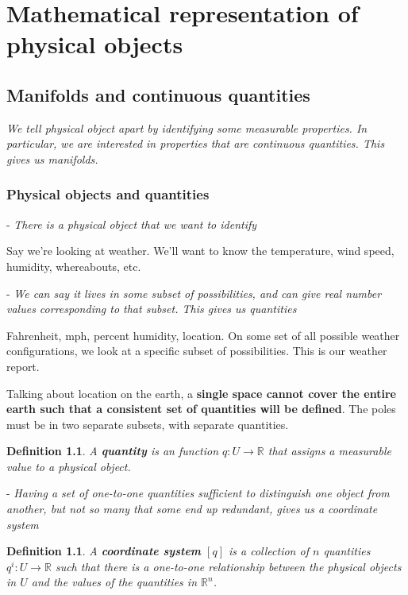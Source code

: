 \documentclass{book}
\newtheorem{defn}[equation]{Definition}
\begin{document}
\tableofcontents

\chapter{Mathematical representation of physical objects}



\section{Manifolds and continuous quantities}
\emph{We tell physical object apart by identifying some measurable properties. In particular, we are interested in properties that are continuous quantities. This gives us manifolds.}

\subsection{Physical objects and quantities}

- \emph{There is a physical object that we want to identify}

Say we're looking at weather. We'll want to know the temperature, wind speed, humidity, whereabouts, etc.

- \emph{We can say it lives in some subset of possibilities, and can give real number values corresponding to that subset. This gives us quantities}

Fahrenheit, mph, percent humidity, location.
On some set of all possible weather configurations, we look at a specific subset of possibilities. This is our weather report.  

Talking about location on the earth, a \textbf{single space cannot cover the entire earth such that a consistent set of quantities will be defined}. The poles must be in two separate subsets, with separate quantities. 

\begin{defn}
	A \textbf{quantity} is an function $q : U \to \mathbb{R}$ that assigns a measurable value to a physical object.
\end{defn}


- \emph{Having a set of one-to-one quantities sufficient to distinguish one object from another, but not so many that some end up redundant, gives us a coordinate system}


\begin{defn}
	A \textbf{coordinate system} $[q]$ is a collection of $n$ quantities $q^i : U \to \mathbb{R}$ such that there is a one-to-one relationship between the physical objects in $U$ and the values of the quantities in $\mathbb{R}^n$.
\end{defn}
\end{document}
